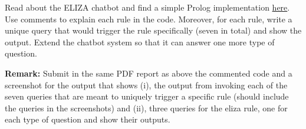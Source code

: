 \documentclass{article}
\newcommand{\answerboxbig}{
    \vspace{20cm} %
}
\begin{document}
Read about the ELIZA chatbot and find a simple Prolog implementation \href{https://swish.swi-prolog.org/example/eliza.pl}{here}. Use comments to explain each rule in the code. Moreover, for each rule, write a unique query that would trigger the rule specifically (seven in total) and show the output. Extend the chatbot system so that it can answer one more type of question.

\textbf{Remark:} 
    Submit in the same PDF report as above the commented code and a screenshot for the output that shows (i), the output from invoking each of the seven queries that are meant to uniquely trigger a specific rule (should include the queries in the screenshots) and (ii), three queries for the eliza rule, one for each type of question and show their outputs.

\answerboxbig



\end{document}
